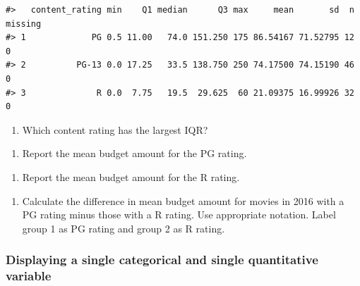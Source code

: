 \documentclass[
]{report}
\providecommand{\tightlist}{%
  \setlength{\itemsep}{0pt}\setlength{\parskip}{0pt}}
\begin{document}
\begin{verbatim}
#>   content_rating min    Q1 median      Q3 max     mean       sd  n missing
#> 1             PG 0.5 11.00   74.0 151.250 175 86.54167 71.52795 12       0
#> 2          PG-13 0.0 17.25   33.5 138.750 250 74.17500 74.15190 46       0
#> 3              R 0.0  7.75   19.5  29.625  60 21.09375 16.99926 32       0
\end{verbatim}

\begin{enumerate}
\def\labelenumi{\arabic{enumi}.}
\tightlist
\item
  Which content rating has the largest IQR?
\end{enumerate}

\vspace{0.8in}

\begin{enumerate}
\def\labelenumi{\arabic{enumi}.}
\setcounter{enumi}{1}
\tightlist
\item
  Report the mean budget amount for the PG rating.
\end{enumerate}

\vspace{0.3in}

\begin{enumerate}
\def\labelenumi{\arabic{enumi}.}
\setcounter{enumi}{2}
\tightlist
\item
  Report the mean budget amount for the R rating.
\end{enumerate}

\vspace{0.3in}

\begin{enumerate}
\def\labelenumi{\arabic{enumi}.}
\setcounter{enumi}{3}
\tightlist
\item
  Calculate the difference in mean budget amount for movies in 2016 with a PG rating minus those with a R rating. Use appropriate notation. Label group 1 as PG rating and group 2 as R rating.
\end{enumerate}

\vspace{0.8in}

\hypertarget{displaying-a-single-categorical-and-single-quantitative-variable}{%
\subsubsection*{Displaying a single categorical and single quantitative variable}\label{displaying-a-single-categorical-and-single-quantitative-variable}}
\end{document}
